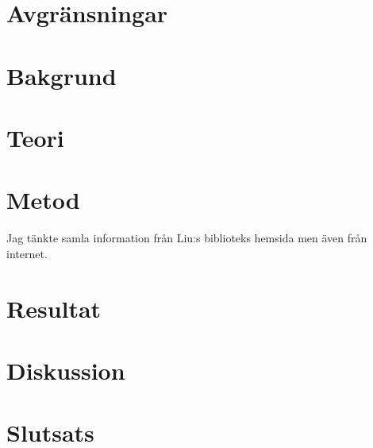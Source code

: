 \section{Avgränsningar}
\section{Bakgrund}
\section{Teori}
\section{Metod}
Jag tänkte samla information från Liu:s biblioteks hemsida men även från internet. 
\section{Resultat}
\section{Diskussion}
\section{Slutsats}